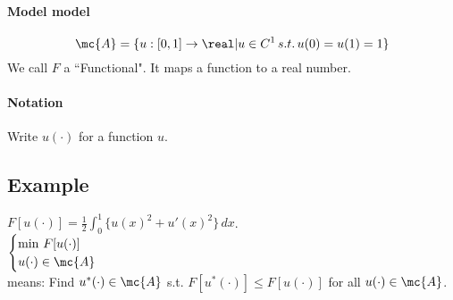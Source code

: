\documentclass[11pt]{article}
\begin{document}
\paragraph{Model model}
$$\mc{A} =  \{ u: [0,1] \rightarrow \real | u \in C^1 \, s.t. \, u(0) = u(1) = 1\}$$
 We call $F$ a ``Functional". It maps a function to a real number.
\paragraph{Notation}
Write $u(\cdot)$ for a function $u$.
\subsection{Example}
$F[u(\cdot)] = \frac{1}{2} \int_0^1 \{ u(x)^2 + u'(x)^2\} \, dx$.\\
$ \begin{cases}
	\min \, F[u(\cdot)] \\
	u(\cdot) \in \mc{A}
\end{cases}$\\
means: Find $u^*(\cdot) \in \mc{A}$ s.t. $F[u^*(\cdot)] \leq F[u(\cdot)]$ for all $u(\cdot) \in \mc{A}$.
\end{document}
